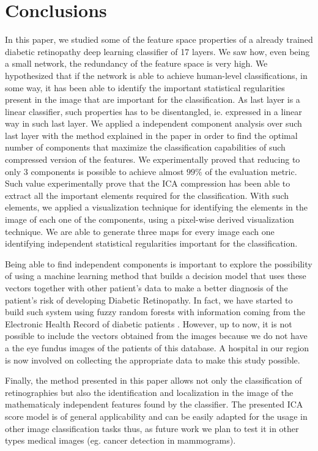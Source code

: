 \documentclass[review]{elsarticle}
\theoremstyle{definition} %
\theoremstyle{remark}
\begin{document}
\section{Conclusions}\label{sec:conclusions}

In this paper, we studied some of the feature space properties of a already trained diabetic retinopathy deep learning classifier of 17 layers. We saw how, even being a small network, the redundancy of the feature space is very high. We hypothesized that if the network is able to achieve human-level classifications, in some way, it has been able to identify the important statistical regularities present in the image that are important for the classification. As last layer is a linear classifier, such properties has to be disentangled, ie. expressed in a linear way in such last layer. We applied a independent component analysis over such last layer with the method explained in the paper in order to find the optimal number of components that maximize the classification capabilities of such compressed version of the features. We experimentally proved that reducing to only 3 components is possible to achieve almost $99\%$ of the evaluation metric. Such value experimentally prove that the ICA compression has been able to extract all the important elements required for the classification. With such elements, we applied a visualization technique for identifying the elements in the image of each one of the components, using a pixel-wise derived visualization technique. We are able to generate three maps for every image each one identifying independent statistical regularities important for the classification.

Being able to find independent components is important to explore the possibility of using a machine learning method that builds a decision model that uses these vectors together with other patient's data to make a better diagnosis of the patient's risk of developing Diabetic Retinopathy. In fact, we have
started to build such system using fuzzy random forests with information coming from the Electronic Health Record of diabetic patients \cite{saleh2017integration, saleh2018learning}. However, up to now, it is not possible to include the vectors obtained from the images because we do not have a the eye fundus images of the patients of this database. A hospital in our region is now involved on collecting the appropriate data to make this study possible.

Finally, the method presented in this paper allows not only the classification of retinographies but also the identification and localization in the image of the mathematicaly independent features found by the classifier. The presented ICA score model is of general applicability and can be easily adapted for the usage in other image classification tasks thus, as future work we plan to test it in other types medical images (eg. cancer detection in mammograms).
\end{document}
